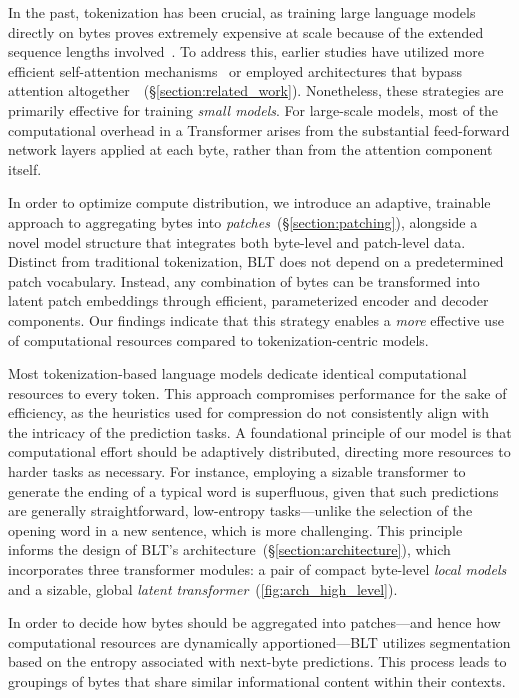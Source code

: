 In the past, tokenization has been crucial, as training large language models directly on bytes proves extremely expensive at scale because of the extended sequence lengths involved~\citep{xue2022byt5}. To address this, earlier studies have utilized more efficient self-attention mechanisms~\citep{el2020characterbert, clark2022canine} or employed architectures that bypass attention altogether~\citep{wang2024mambabyte}~(\S\ref{section:related_work}). Nonetheless, these strategies are primarily effective for training \textit{small models}. For large-scale models, most of the computational overhead in a Transformer arises from the substantial feed-forward network layers applied at each byte, rather than from the attention component itself.

In order to optimize compute distribution, we introduce an adaptive, trainable approach to aggregating bytes into \textit{patches}~(\S\ref{section:patching}), alongside a novel model structure that integrates both byte-level and patch-level data. Distinct from traditional tokenization, {\textsc BLT} does not depend on a predetermined patch vocabulary. Instead, any combination of bytes can be transformed into latent patch embeddings through efficient, parameterized encoder and decoder components. Our findings indicate that this strategy enables a \textit{more} effective use of computational resources compared to tokenization-centric models.

Most tokenization-based language models dedicate identical computational resources to every token. This approach compromises performance for the sake of efficiency, as the heuristics used for compression do not consistently align with the intricacy of the prediction tasks. A foundational principle of our model is that computational effort should be adaptively distributed, directing more resources to harder tasks as necessary. For instance, employing a sizable transformer to generate the ending of a typical word is superfluous, given that such predictions are generally straightforward, low-entropy tasks—unlike the selection of the opening word in a new sentence, which is more challenging. This principle informs the design of {\textsc BLT}'s architecture~(\S\ref{section:architecture}), which incorporates three transformer modules: a pair of compact byte-level \textit{local models} and a sizable, global \textit{latent transformer}~(\autoref{fig:arch_high_level}).

In order to decide how bytes should be aggregated into patches—and hence how computational resources are dynamically apportioned—{\textsc BLT} utilizes segmentation based on the entropy associated with next-byte predictions. This process leads to groupings of bytes that share similar informational content within their contexts.

